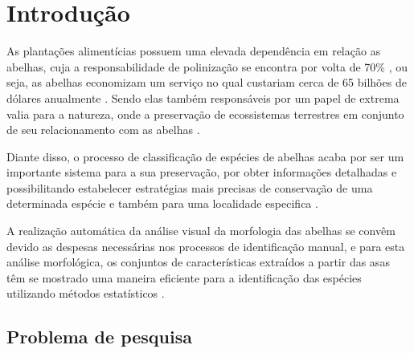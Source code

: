 \documentclass[
	12pt,				%
	oneside,			%
	a4paper,			%
	english,			%
	brazil				%
	]{abntex2ppgsi}
\begin{document}
\tableofcontents*
\cleardoublepage



\textual



% 
%
%
\chapter{Introdução}
As plantações alimentícias possuem uma elevada dependência  em relação as abelhas, cuja a responsabilidade de polinização se encontra por volta de 70\% \cite{drauschke2007reliable}, ou seja, as abelhas economizam um serviço no qual custariam cerca de 65 bilhões de dólares anualmente \cite{pimentel1997economic}. Sendo elas também responsáveis por um papel de extrema valia para a natureza, onde a preservação de ecossistemas terrestres em conjunto de seu relacionamento com as abelhas \cite{lawton1998daily}. 

Diante disso, o processo de classificação de espécies de abelhas acaba por ser um importante sistema para a sua preservação, por obter informações detalhadas e possibilitando estabelecer estratégias mais precisas de conservação de uma determinada espécie e também para uma localidade especifica \cite{goulson2015bee}. 

A realização automática da análise visual da morfologia das abelhas se convêm devido as despesas necessárias nos processos de identificação manual, e para esta análise morfológica, os conjuntos de características extraídos a partir das asas têm se mostrado uma maneira eficiente para a identificação das espécies utilizando métodos estatísticos \cite{francoy2008identification}.


\section{Problema de pesquisa}
 
\end{document}
